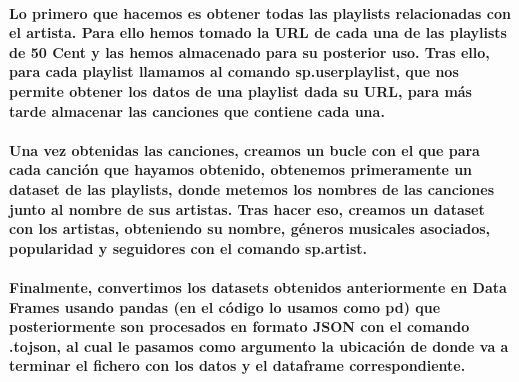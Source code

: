 \documentclass[11pt,spanish]{article}
\begin{document}
\paragraph*{Lo primero que hacemos es obtener todas las playlists relacionadas con el artista. Para ello hemos tomado la URL de cada una de las playlists de 50 Cent y las hemos almacenado para su posterior uso. 
Tras ello, para cada playlist llamamos al comando sp.user\textunderscore playlist, que nos permite obtener los datos de una playlist dada su URL, para más tarde almacenar las canciones que contiene cada una.}

\paragraph*{Una vez obtenidas las canciones, creamos un bucle con el que para cada canción que hayamos obtenido, obtenemos primeramente un dataset de las playlists, donde metemos los nombres de las canciones junto al nombre de sus artistas. 
Tras hacer eso, creamos un dataset con los artistas, obteniendo su nombre, géneros musicales asociados, popularidad y seguidores con el comando sp.artist. }

\paragraph*{Finalmente, convertimos los datasets obtenidos anteriormente en Data Frames usando pandas (en el código lo usamos como pd) que posteriormente son procesados en formato JSON con el comando .to\textunderscore json, al cual le pasamos como argumento la ubicación de donde va a terminar el fichero con los datos y el dataframe correspondiente. }
\end{document}
